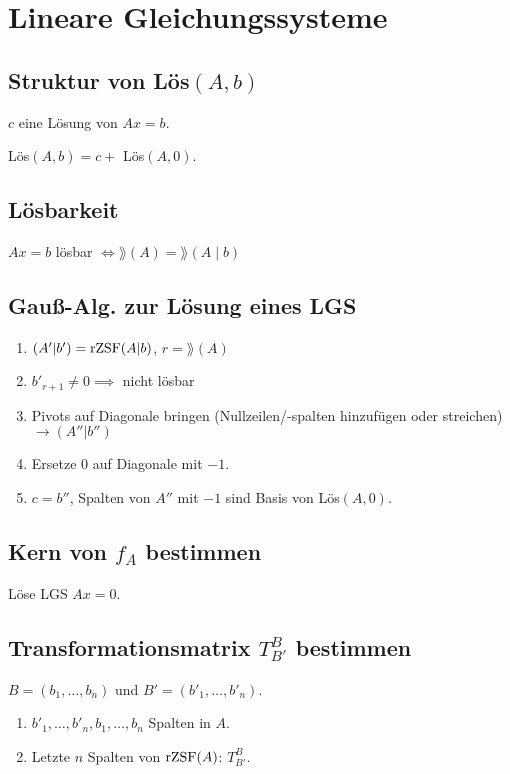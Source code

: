 \section*{Lineare Gleichungssysteme}

\subsection*{Struktur von Lös$(A,b)$}
$c$ eine Lösung von $Ax=b$.

Lös$(A,b)=c+$ Lös$(A,0)$.

\subsection*{Lösbarkeit}
$Ax=b$ lösbar $\Leftrightarrow \rang(A) = \rang(A \mid b)$

\subsection*{Gauß-Alg. zur Lösung eines LGS}
\begin{enumerate}
	\item $(A'|b')=\operatorname{rZSF}(A|b)$, $r=\rang(A)$
	\item $b'_{r+1}\neq 0 \implies$ nicht lösbar
	\item Pivots auf Diagonale bringen (Nullzeilen/-spalten hinzufügen oder streichen) $\rightarrow (A''|b'')$
	\item Ersetze 0 auf Diagonale mit $-1$.
	\item $c=b''$, Spalten von $A''$ mit $-1$ sind Basis von Lös$(A,0)$.
\end{enumerate}

\subsection*{Kern von $f_A$ bestimmen}
Löse LGS $Ax=0$.

\subsection*{Transformationsmatrix $T_{B'}^B$ bestimmen}
$B=(b_1,\dots,b_n)$ und $B'=(b'_1,\dots,b'_n)$.

\begin{enumerate}
	\item $b'_1,\dots,b'_n,b_1,\dots,b_n$ Spalten in $A$.
	\item Letzte $n$ Spalten von $\operatorname{rZSF}(A)$: $T_{B'}^B$.
\end{enumerate}

